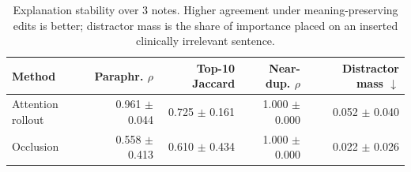 \begin{table}[t]
\centering
\caption{Explanation stability over 3 notes. Higher agreement under meaning-preserving edits is better; distractor mass is the share of importance placed on an inserted clinically irrelevant sentence.}
\label{tab:stability}
\begin{tabular}{lrrrr}
\toprule
Method & Paraphr. $\rho$ & Top-10 Jaccard & Near-dup. $\rho$ & Distractor mass $\downarrow$ \\
\midrule
Attention rollout & 0.961 $\pm$ 0.044 & 0.725 $\pm$ 0.161 & 1.000 $\pm$ 0.000 & 0.052 $\pm$ 0.040 \\
Occlusion & 0.558 $\pm$ 0.413 & 0.610 $\pm$ 0.434 & 1.000 $\pm$ 0.000 & 0.022 $\pm$ 0.026 \\
\bottomrule
\end{tabular}
\end{table}

